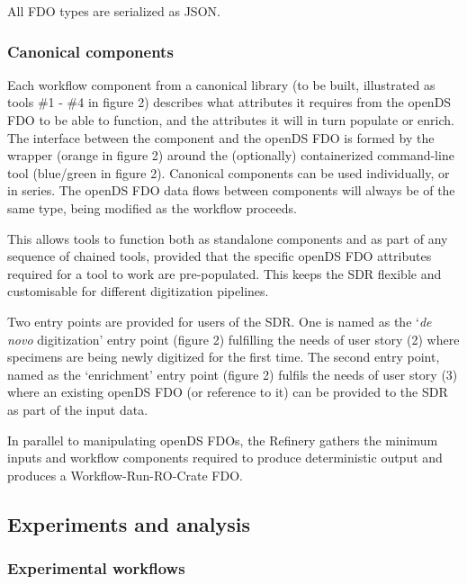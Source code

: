 All FDO types are serialized as JSON.

\hypertarget{canonical-components}{%
\subsubsection{Canonical components}\label{canonical-components}}

Each workflow component from a canonical library (to be built,
illustrated as tools \#1 - \#4 in figure 2) describes what attributes it
requires from the openDS FDO to be able to function, and the attributes
it will in turn populate or enrich. The interface between the component
and the openDS FDO is formed by the wrapper (orange in figure 2) around
the (optionally) containerized command-line tool (blue/green in figure
2). Canonical components can be used individually, or in series. The
openDS FDO data flows between components will always be of the same
type, being modified as the workflow proceeds.

This allows tools to function both as standalone components and as part
of any sequence of chained tools, provided that the specific openDS FDO
attributes required for a tool to work are pre-populated. This keeps the
SDR flexible and customisable for different digitization pipelines.

Two entry points are provided for users of the SDR. One is named as the
`\emph{de novo} digitization' entry point (figure 2) fulfilling the
needs of user story (2) where specimens are being newly digitized for
the first time. The second entry point, named as the `enrichment' entry
point (figure 2) fulfils the needs of user story (3) where an existing
openDS FDO (or reference to it) can be provided to the SDR as part of
the input data.

In parallel to manipulating openDS FDOs, the Refinery gathers the
minimum inputs and workflow components required to produce deterministic
output and produces a Workflow-Run-RO-Crate FDO.

\hypertarget{experiments-and-analysis}{%
\subsection{Experiments and
analysis}\label{experiments-and-analysis}}

\hypertarget{experimental-workflows}{%
\subsubsection{Experimental
workflows}\label{experimental-workflows}}

